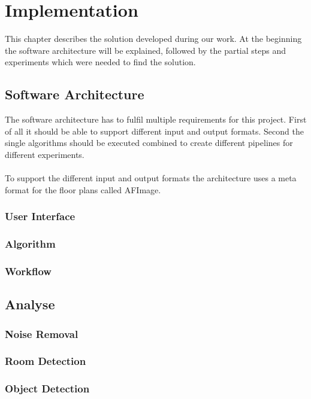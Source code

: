 \section{Implementation}
This chapter describes the solution developed during our work. At the beginning the software architecture will be explained, followed by the partial steps and experiments which were needed to find the solution.

\subsection{Software Architecture}
The software architecture has to fulfil multiple requirements for this project. First of all it should be able to support different input and output formats. Second the single algorithms should be executed combined to create different pipelines for different experiments.
\\\\
To support the different input and output formats the architecture uses a meta format for the floor plans called AFImage.


\subsubsection{User Interface}
\subsubsection{Algorithm}
\subsubsection{Workflow}

\subsection{Analyse}
\subsubsection{Noise Removal}
\subsubsection{Room Detection}
\subsubsection{Object Detection}